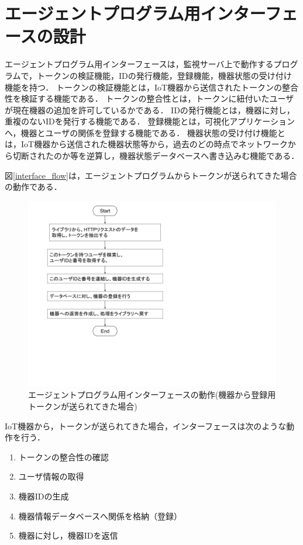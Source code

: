 \section{エージェントプログラム用インターフェースの設計}
エージェントプログラム用インターフェースは，監視サーバ上で動作するプログラムで，トークンの検証機能，IDの発行機能，登録機能，機器状態の受け付け機能を持つ．
トークンの検証機能とは，IoT機器から送信されたトークンの整合性を検証する機能である．
トークンの整合性とは，トークンに紐付いたユーザが現在機器の追加を許可しているかである．
IDの発行機能とは，機器に対し，重複のないIDを発行する機能である．
登録機能とは，可視化アプリケーションへ，機器とユーザの関係を登録する機能である．
機器状態の受け付け機能とは，IoT機器から送信された機器状態等から，過去のどの時点でネットワークから切断されたのか等を逆算し，機器状態データベースへ書き込みむ機能である．

図\ref{interface_flow}は，エージェントプログラムからトークンが送られてきた場合の動作である．
\begin{figure}[htbp]
\includegraphics[width=16cm]{images/interface_flow.png}
\caption{エージェントプログラム用インターフェースの動作(機器から登録用トークンが送られてきた場合)}
\label{fig:interface_flow}
\end{figure}
IoT機器から，トークンが送られてきた場合，インターフェースは次のような動作を行う．
\begin{enumerate}
\item トークンの整合性の確認
\item ユーザ情報の取得
\item 機器IDの生成
\item 機器情報データベースへ関係を格納（登録）
\item 機器に対し，機器IDを返信
\end{enumerate}


